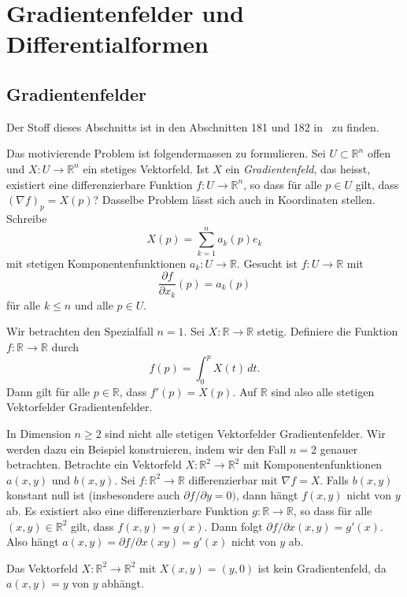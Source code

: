 \documentclass[../main.tex]{subfiles}
\begin{document}
\chapter{Gradientenfelder und Differentialformen}\label{chp:gradients}
\section{Gradientenfelder}
Der Stoff dieses Abschnitts ist in den
Abschnitten 181 und 182 in~\cite{heuser} zu finden.

Das motivierende Problem ist folgendermassen zu formulieren.
Sei $U \subset \mathbb{R}^n$ offen und
$X \colon U \to \mathbb{R}^n$ ein stetiges Vektorfeld.
Ist $X$ ein \emph{Gradientenfeld}, das heisst,
existiert
eine differenzierbare Funktion
$f \colon U \to \mathbb{R}^n$,
so dass für alle $p \in U$ gilt, dass ${(\nabla f)}_p = X(p)$?
Dasselbe Problem lässt sich auch in Koordinaten stellen.
Schreibe
\[
  X(p) = \sum_{k=1}^{n} a_k(p) e_k
\]
mit stetigen Komponentenfunktionen $a_k \colon U \to \mathbb{R}$.
Gesucht ist $f \colon U \to \mathbb{R}$ mit
\[
  \frac{\partial f}{\partial x_k} (p) = a_k(p)
\]
für alle
$k \leq n$ und alle $p \in U$.

\begin{specialcase}
  Wir betrachten den Spezialfall $n = 1$.
  Sei $X \colon \mathbb{R} \to \mathbb{R}$ stetig.
  Definiere die Funktion
  $f \colon \mathbb{R} \to \mathbb{R}$ 
  durch 
  \[
    f(p) = \int_{0}^{p} X(t) \, dt.
  \]
  Dann gilt für alle $p \in \mathbb{R}$,
  dass $f'(p) = X(p)$.
  Auf $\mathbb{R}$ sind also alle stetigen Vektorfelder Gradientenfelder.
\end{specialcase}

In Dimension $n \geq 2$ sind nicht alle stetigen
Vektorfelder Gradientenfelder.
Wir werden dazu ein Beispiel konstruieren, indem wir
den Fall $n = 2$ genauer betrachten.
Betrachte ein Vektorfeld $X \colon \mathbb{R}^2 \to \mathbb{R}^2$
mit Komponentenfunktionen $a(x, y)$ und $b(x, y)$.
Sei $f \colon \mathbb{R}^2 \to \mathbb{R}$ differenzierbar
mit $\nabla f = X$.
Falls $b(x, y)$ konstant null ist (insbesondere auch
$\partial f / \partial y = 0)$, dann hängt
$f(x, y)$ nicht von $y$ ab.
Es existiert also eine
differenzierbare Funktion
$g \colon \mathbb{R} \to \mathbb{R}$,
so dass für alle $(x, y) \in \mathbb{R}^2$ gilt,
dass $f(x, y) = g(x)$.
Dann folgt $\partial f / \partial x (x, y) = g'(x)$.
Also hängt $a(x, y) = \partial f / \partial x(x y) = g'(x)$
nicht von $y$ ab.

\begin{example}
  Das Vektorfeld $X \colon \mathbb{R}^2 \to \mathbb{R}^2$ 
  mit $X(x, y) = (y, 0)$ ist kein Gradientenfeld,
  da $a(x, y) = y$ von $y$ abhängt.
\end{example}
\end{document}
